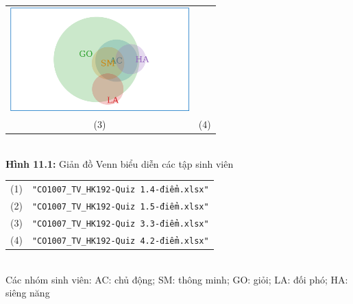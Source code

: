 \documentclass[a4paper]{article}
\theoremstyle{definition}
\begin{document}
\begin{itemize}
\begin{center}
\begin{tabular}{c c}
                 \includegraphics[width = 6.9cm]{Images/img11-1-4.png} \\
                 (3) & (4)
            \end{tabular}\\
            \textbf{Hình 11.1:} Giản đồ Venn biểu diễn các tập sinh viên\\
            \begin{tabular}{c c}
                 (1) & \texttt{"CO1007\_TV\_HK192-Quiz 1.4-điểm.xlsx"}\\
                 (2) & \texttt{"CO1007\_TV\_HK192-Quiz 1.5-điểm.xlsx"}\\
                 (3) & \texttt{"CO1007\_TV\_HK192-Quiz 3.3-điểm.xlsx"}\\
                 (4) & \texttt{"CO1007\_TV\_HK192-Quiz 4.2-điểm.xlsx"}
            \end{tabular}\\
            Các nhóm sinh viên: AC: chủ động; SM: thông minh; GO: giỏi; LA: đối phó; HA: siêng năng
        \end{center}
    \end{itemize}

\end{document}
